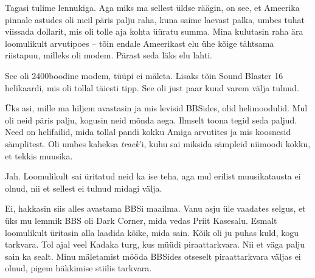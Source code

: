 
Tagasi tulime lennukiga. Aga miks ma sellest üldse räägin, on see, et 
Ameerika pinnale astudes oli meil päris palju raha, kuna saime laevast 
palka, umbes tuhat viissada dollarit, mis oli tolle aja kohta üüratu 
summa. Mina kulutasin raha ära loomulikult arvutipoes -- tõin endale Ameerikast elu ühe kõige tähtsama riistapuu, 
milleks oli modem. Pärast seda läks elu lahti. 

See oli 2400boodine modem, tüüpi ei mäleta. Lisaks 
tõin Sound Blaster 16 helikaardi, mis oli tollal täiesti 
tipp. See oli just paar kuud varem välja tulnud. 

Üks asi, mille ma hiljem avastasin ja mis levisid BBSides, olid helimoodulid. 
Mul oli neid päris palju, kogusin neid mõnda aega. Ilmselt toona 
tegid seda paljud. Need on helifailid, mida tollal pandi kokku
Amiga arvutites ja mis koosnesid sämplitest. Oli umbes kaheksa \emph{track}'i, kuhu sai miksida sämpleid niimoodi 
kokku, et tekkis muusika. 


Jah. Loomulikult sai üritatud neid ka ise teha, aga mul erilist muusikatausta ei olnud, nii et sellest ei tulnud midagi välja.


Ei, hakkasin siis alles avastama BBSi 
maailma. Vanu asju üle vaadates selgus, et üks mu lemmik BBS oli Dark 
Corner, mida vedas Priit Kasesalu. Esmalt loomulikult üritasin alla laadida kõike, mida sain. 
Kõik oli ju puhas kuld, kogu tarkvara. 
Tol ajal veel
Kadaka turg, kus müüdi piraattarkvara. Nii et
väga palju sain ka sealt. Minu mäletamist mööda BBSides 
otseselt piraattarkvara väljas ei olnud, pigem 
häkkimise stiilis tarkvara.

